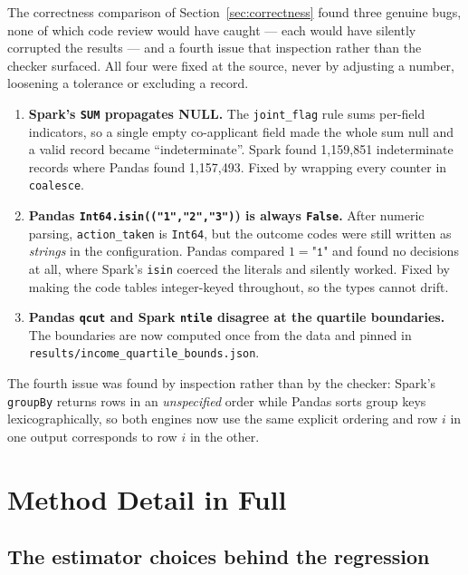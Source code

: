 \documentclass[sigconf,balance=false]{acmart}
\begin{document}
The correctness comparison of Section~\ref{sec:correctness} found three
genuine bugs, none of which code review would have caught --- each would
have silently corrupted the results --- and a fourth issue that inspection
rather than the checker surfaced. All four were fixed at the source, never
by adjusting a number, loosening a tolerance or excluding a record.

\begin{enumerate}
  \item \textbf{Spark's \texttt{SUM} propagates NULL.} The
        \texttt{joint\_\allowbreak flag} rule sums per-field indicators, so a single
        empty co-applicant field made the whole sum null and a valid record
        became ``indeterminate''. Spark found 1{,}159{,}851 indeterminate
        records where Pandas found 1{,}157{,}493. Fixed by wrapping every
        counter in \texttt{coalesce}.
  \item \textbf{Pandas \texttt{Int64.isin(("1","2","3")}) is always
        \texttt{False}.} After numeric parsing, \texttt{action\_\allowbreak taken} is
        \texttt{Int64}, but the outcome codes were still written as
        \emph{strings} in the configuration. Pandas compared $1 = \texttt{"1"}$
        and found no decisions at all, where Spark's \texttt{isin} coerced the
        literals and silently worked. Fixed by making the code tables
        integer-keyed throughout, so the types cannot drift.
  \item \textbf{Pandas \texttt{qcut} and Spark \texttt{ntile} disagree at the
        quartile boundaries.} The boundaries are now computed once from the
        data and pinned in
        \texttt{results/income\_\allowbreak quartile\_\allowbreak bounds.json}.
\end{enumerate}

The fourth issue was found by inspection rather than by the checker: Spark's
\texttt{groupBy} returns rows in an \emph{unspecified} order while Pandas
sorts group keys lexicographically, so both engines now use the same explicit
ordering and row $i$ in one output corresponds to row $i$ in the other.
\FloatBarrier

\section{Method Detail in Full}\label{app:method}

\subsection{The estimator choices behind the regression}
\end{document}
